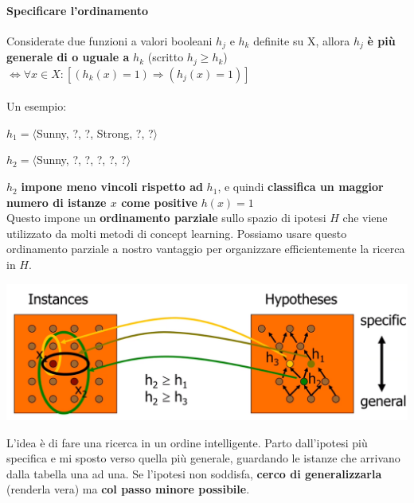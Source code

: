 \documentclass[10pt]{book}
\begin{document}
\paragraph{Specificare l'ordinamento}
Considerate due funzioni a valori booleani $h_j$ e $h_k$ definite su X, allora $h_j$ \textbf{è più generale di o uguale a} $h_k$ (scritto $h_j \geq h_k$) $\Leftrightarrow \forall x \in X : [(h_k(x) = 1) \Rightarrow (h_j(x) = 1)]$\\\\
Un esempio:
\begin{list}{}{}
	\item $h_1 = \langle$Sunny, ?, ?, Strong, ?, ?$\rangle$
	\item $h_2 = \langle$Sunny, ?, ?, ?, ?, ?$\rangle$
\end{list}
$h_2$ \textbf{impone meno vincoli rispetto ad} $h_1$, e quindi \textbf{classifica un maggior numero di istanze $x$ come positive} $h(x) = 1$\\
Questo impone un \textbf{ordinamento parziale} sullo spazio di ipotesi $H$ che viene utilizzato da molti metodi di concept learning. Possiamo usare questo ordinamento parziale a nostro vantaggio per organizzare efficientemente la ricerca in $H$.
\begin{center}
	\includegraphics[scale=0.6]{ml_strutturadih.png}
\end{center}
L'idea è di fare una ricerca in un ordine intelligente. Parto dall'ipotesi più specifica e mi sposto verso quella più generale, guardando le istanze che arrivano dalla tabella una ad una. Se l'ipotesi non soddisfa, \textbf{cerco di generalizzarla} (renderla vera) ma \textbf{col passo minore possibile}.
\pagebreak
\end{document}
